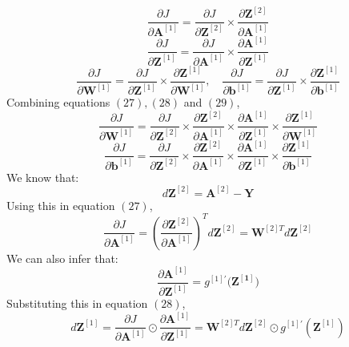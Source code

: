 \documentclass{article}
\begin{document}
\begin{equation}
    \frac{\partial J}{\partial \mathbf{A}^{[1]}}= \frac{\partial J}{\partial \mathbf{Z}^{[2]}} \times\frac{\partial \mathbf{Z}^{[2]}}{\partial \mathbf{A}^{[1]}}
\end{equation}
\begin{equation}
    \frac{\partial J}{\partial \mathbf{Z}^{[1]}}= \frac{\partial J}{\partial \mathbf{A}^{[1]}} \times\frac{\partial \mathbf{A}^{[1]}}{\partial \mathbf{Z}^{[1]}}
\end{equation}
\begin{equation}
    \frac{\partial J}{\partial \mathbf{W}^{[1]}}= \frac{\partial J}{\partial \mathbf{Z}^{[1]}} \times\frac{\partial \mathbf{Z}^{[1]}}{\partial \mathbf{W}^{[1]}}, \quad \frac{\partial J}{\partial \mathbf{b}^{[1]}}= \frac{\partial J}{\partial \mathbf{Z}^{[1]}} \times\frac{\partial \mathbf{Z}^{[1]}}{\partial \mathbf{b}^{[1]}}
\end{equation}
Combining equations $(27), (28)$ and $(29)$, 
\begin{equation}
    \frac{\partial J}{\partial \mathbf{W}^{[1]}}= \frac{\partial J}{\partial \mathbf{Z}^{[2]}} \times\frac{\partial \mathbf{Z}^{[2]}}{\partial \mathbf{A}^{[1]}} \times \frac{\partial \mathbf{A}^{[1]}}{\partial \mathbf{Z}^{[1]}} \times \frac{\partial \mathbf{Z}^{[1]}}{\partial \mathbf{W}^{[1]}}
\end{equation}
\begin{equation}
    \frac{\partial J}{\partial \mathbf{b}^{[1]}}= \frac{\partial J}{\partial \mathbf{Z}^{[2]}} \times\frac{\partial \mathbf{Z}^{[2]}}{\partial \mathbf{A}^{[1]}} \times \frac{\partial \mathbf{A}^{[1]}}{\partial \mathbf{Z}^{[1]}} \times \frac{\partial \mathbf{Z}^{[1]}}{\partial \mathbf{b}^{[1]}}
\end{equation}
We know that:
$$d\mathbf{Z}^{[2]} = \mathbf{A}^{[2]} - \mathbf{Y}$$
Using this in equation $(27)$,
$$\frac{\partial J}{\partial \mathbf{A}^{[1]}} = \left(\frac{\partial \mathbf{Z}^{[2]}}{\partial \mathbf{A}^{[1]}}\right)^T d\mathbf{Z}^{[2]} = \mathbf{W}^{[2]T} d\mathbf{Z}^{[2]}$$
We can also infer that:
$$\frac{\partial \mathbf{A}^{[1]}}{\partial \mathbf{Z}^{[1]}}=g^{[1]'}(\mathbf{Z^{[1]})}$$
Substituting this in equation $(28)$,
$$d\mathbf{Z}^{[1]} = \frac{\partial J}{\partial \mathbf{A}^{[1]}} \odot \frac{\partial \mathbf{A}^{[1]}}{\partial \mathbf{Z}^{[1]}} = \mathbf{W}^{[2]T} d\mathbf{Z}^{[2]} \odot g^{[1]\prime}(\mathbf{Z}^{[1]})$$
\end{document}
